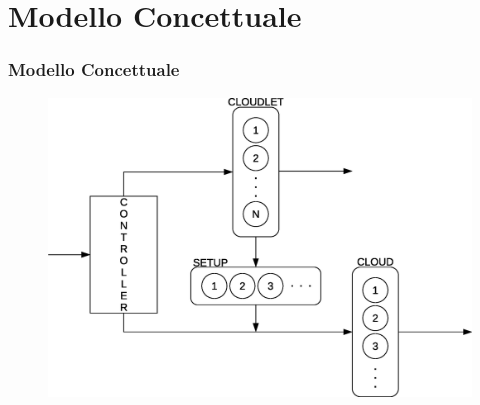 \section{Modello Concettuale}

\begin{frame}
\frametitle{Modello Concettuale}

\begin{figure}[!h]
\centering
\includegraphics[width=\textwidth]{../figures/conceptual}
\label{conceptual}
\end{figure}

\end{frame}
